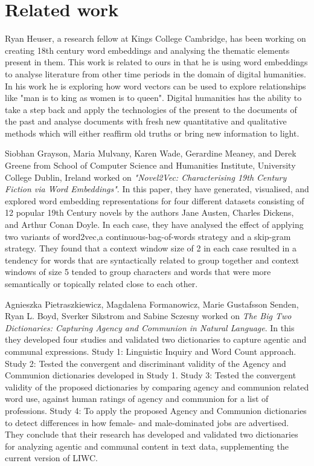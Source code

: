 \documentclass{article}
\begin{document}
\section{Related work}
Ryan Heuser, a research fellow at Kings College Cambridge, has been working on creating 18th century word embeddings and analysing the thematic elements present in them. This work is related to ours in that he is using word embeddings to analyse literature from other time periods in the domain of digital humanities. In his work he is exploring how word vectors can be used to explore relationships like "man is to king as women is to queen".  Digital humanities has the ability to take a step back and apply the technologies of the present to the documents of the past and analyse documents with fresh new quantitative and qualitative methods which will either reaffirm old truths or bring new information to light.


Siobhan Grayson, Maria Mulvany, Karen Wade, Gerardine Meaney, and Derek Greene from School of Computer Science and Humanities Institute, University College Dublin, Ireland worked on {\it "Novel2Vec: Characterising 19th Century Fiction via Word Embeddings"}. In this paper, they have generated, visualised, and explored word embedding representations for four different datasets consisting of 12 popular 19th Century novels by the authors Jane Austen, Charles Dickens, and Arthur Conan Doyle. In each case, they have analysed the effect of applying two variants of word2vec,a continuous-bag-of-words strategy and a skip-gram strategy. They found that a context window size of 2 in each case resulted in a tendency for words that are syntactically related to group together and context windows of size 5 tended to group characters and words that were more semantically or topically related close to each other.

Agnieszka Pietraszkiewicz, Magdalena Formanowicz, Marie Gustafsson Senden, Ryan L. Boyd, Sverker Sikstrom and Sabine Sczesny worked on {\it The Big Two Dictionaries: Capturing Agency and Communion in Natural Language}. In this they developed four studies and validated two dictionaries to capture agentic and communal expressions. Study 1: Linguistic Inquiry and Word Count approach. Study 2: Tested the convergent and discriminant validity of the Agency and Communion dictionaries developed in Study 1. Study 3: Tested the convergent validity of the proposed dictionaries by comparing agency and communion related word use, against human ratings of agency and communion for a list of professions. Study 4: To apply the proposed Agency and Communion dictionaries to detect differences in how female- and male-dominated jobs are advertised. They conclude that their research has developed and validated two dictionaries for analyzing agentic and communal content in text data, supplementing the current version of LIWC.  
\end{document}
